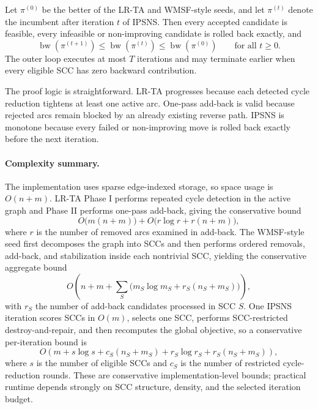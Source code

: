 \begin{proposition}
\label{prop:ipsns-monotonicity}
Let \(\pi^{(0)}\) be the better of the LR-TA and WMSF-style seeds, and let \(\pi^{(t)}\) denote the incumbent after iteration \(t\) of IPSNS. Then every accepted candidate is feasible, every infeasible or non-improving candidate is rolled back exactly, and
\begin{equation}
    \operatorname{bw}\!\left(\pi^{(t+1)}\right)\le \operatorname{bw}\!\left(\pi^{(t)}\right)\le \operatorname{bw}\!\left(\pi^{(0)}\right)
    \qquad \text{for all } t\ge 0.
    \label{eq:ipsns-monotonicity}
\end{equation}
The outer loop executes at most \(T\) iterations and may terminate earlier when every eligible SCC has zero backward contribution.
\end{proposition}

The proof logic is straightforward. LR-TA progresses because each detected cycle reduction tightens at least one active arc. One-pass add-back is valid because rejected arcs remain blocked by an already existing reverse path. IPSNS is monotone because every failed or non-improving move is rolled back exactly before the next iteration.

\paragraph{Complexity summary.}
The implementation uses sparse edge-indexed storage, so space usage is \(O(n+m)\). LR-TA Phase I performs repeated cycle detection in the active graph and Phase II performs one-pass add-back, giving the conservative bound
\begin{equation}
    O\!\big(m(n+m)\big) + O\!\big(r\log r + r(n+m)\big),
    \label{eq:lrta-complexity}
\end{equation}
where \(r\) is the number of removed arcs examined in add-back. The WMSF-style seed first decomposes the graph into SCCs and then performs ordered removals, add-back, and stabilization inside each nontrivial SCC, yielding the conservative aggregate bound
\begin{equation}
    O\!\left(n+m + \sum_{S}\big(m_S\log m_S + r_S(n_S+m_S)\big)\right),
    \label{eq:wmsf-complexity}
\end{equation}
with \(r_S\) the number of add-back candidates processed in SCC \(S\). One IPSNS iteration scores SCCs in \(O(m)\), selects one SCC, performs SCC-restricted destroy-and-repair, and then recomputes the global objective, so a conservative per-iteration bound is
\begin{equation}
    O\!\left(m + s\log s + c_S(n_S+m_S) + r_S\log r_S + r_S(n_S+m_S)\right),
    \label{eq:ipsns-iter-complexity}
\end{equation}
where \(s\) is the number of eligible SCCs and \(c_S\) is the number of restricted cycle-reduction rounds. These are conservative implementation-level bounds; practical runtime depends strongly on SCC structure, density, and the selected iteration budget.

